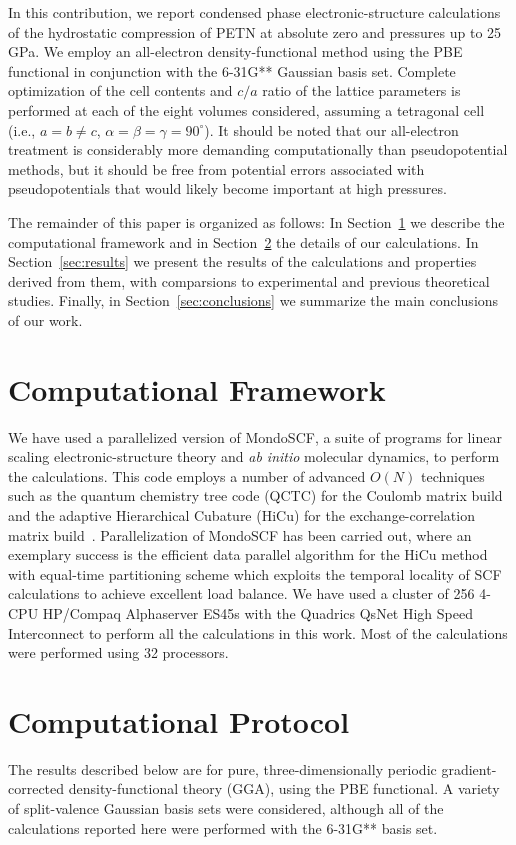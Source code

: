 \documentclass[prb,aps,nobibnotes,twocolumn,doublespace,twocolumngrid,superbib]{revtex4}
\begin{document}
In this contribution, we report condensed phase electronic-structure
calculations of the hydrostatic compression of PETN at absolute zero
and pressures up to 25 GPa.  We employ an all-electron density-functional 
method using the PBE functional in conjunction with the 6-31G** Gaussian basis 
set.   Complete optimization of the cell contents and $c/a$ ratio of the 
lattice 
parameters is performed at each of the eight volumes considered, assuming 
a tetragonal cell (i.e., $a=b \neq c$, $\alpha=\beta=\gamma=90^\circ$).
It should be noted that our all-electron treatment is considerably more
demanding computationally than pseudopotential methods, but it should
be free from potential errors associated with pseudopotentials that would
likely become important at high pressures.

The remainder of this paper is organized as follows: In
Section~\ref{sec:comput} we describe the computational framework and
in Section~\ref{sec:protocol} the 
details of our calculations. In Section~\ref{sec:results} we 
present the results of the calculations and properties derived from them,
with comparsions to experimental and previous theoretical studies. 
Finally, in Section~\ref{sec:conclusions} we summarize the main conclusions
of our work.

\section{Computational Framework}
\label{sec:comput}
We have used a parallelized version of MondoSCF\cite{MondoSCF}, 
a suite of programs
for linear scaling electronic-structure theory and 
{\it ab initio} molecular dynamics, to perform the calculations.  This code employs a
number of advanced $O(N)$ techniques such as the quantum chemistry tree code
(QCTC) for the Coulomb matrix build
\cite{MChallacombe96,MChallacombe96B,MChallacombe97} and
the adaptive Hierarchical Cubature (HiCu) for the exchange-correlation 
matrix build~\cite{MChallacombe00A}. Parallelization of MondoSCF
has been carried out, where an exemplary success is 
the efficient data parallel algorithm for the
HiCu method\cite{CGan03} with equal-time partitioning scheme
which exploits the temporal locality of SCF 
calculations to achieve excellent load
balance. We have
used a cluster of 256 4-CPU HP/Compaq Alphaserver ES45s with the
Quadrics QsNet High Speed Interconnect to perform all the calculations 
in this work.   Most of the calculations were performed using 32 
processors.

\section{Computational Protocol}
\label{sec:protocol}
The results described below are for pure, three-dimensionally periodic 
gradient-corrected density-functional theory (GGA), using the PBE
functional\cite{Perdew_96v77}. A variety of split-valence Gaussian
basis sets were considered, although all of the calculations reported
here were performed with the 6-31G** basis set. 
\end{document}
